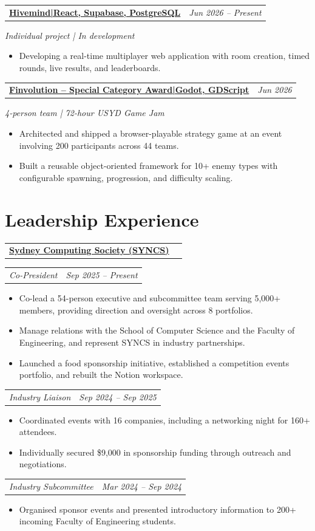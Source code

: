 \documentclass[10pt,a4paper]{article}
\makeatletter
\newcommand{\linkedproject}[4]{%
  \vspace{6pt}
  \begin{tabularx}{\textwidth}{@{}Xr@{}}
    \textbf{\href{#1}{#2\enspace|\enspace#3}} & \textit{#4}
  \end{tabularx}\vspace{-1pt}
}
\newcommand{\projectcontext}[1]{%
  \textit{#1}\par\vspace{-1pt}
}
\newcommand{\organisation}[2]{%
  \vspace{3pt}
  \begin{tabularx}{\textwidth}{@{}Xr@{}}
    \textbf{#1} & \textbf{#2}
  \end{tabularx}\vspace{-1pt}
}
\newcommand{\role}[2]{%
  \begin{tabularx}{\textwidth}{@{}Xr@{}}
    \textit{#1} & \textit{#2}
  \end{tabularx}\vspace{-1pt}
}
\makeatother
\begin{document}
\linkedproject
  {https://meta-game-arena.vercel.app/}
  {Hivemind}
  {React, Supabase, PostgreSQL}
  {Jun 2026 -- Present}
\projectcontext{Individual project | In development}
\begin{itemize}
  \item Developing a real-time multiplayer web application with room creation, timed rounds, live results, and leaderboards.
\end{itemize}

\linkedproject
  {https://richardlr03.itch.io/finvolution}
  {Finvolution -- Special Category Award}
  {Godot, GDScript}
  {Jun 2026}
\projectcontext{4-person team | 72-hour USYD Game Jam}
\begin{itemize}
  \item Architected and shipped a browser-playable strategy game at an event involving 200 participants across 44 teams.
  \item Built a reusable object-oriented framework for 10+ enemy types with configurable spawning, progression, and difficulty scaling.
\end{itemize}

\section{Leadership Experience}

\organisation{\href{https://syncs.org.au/about}{Sydney Computing Society (SYNCS)}}{}
\role{Co-President}{Sep 2025 -- Present}
\begin{itemize}
  \item Co-lead a 54-person executive and subcommittee team serving 5,000+ members, providing direction and oversight across 8 portfolios.
  \item Manage relations with the School of Computer Science and the Faculty of Engineering, and represent SYNCS in industry partnerships.
  \item Launched a food sponsorship initiative, established a competition events portfolio, and rebuilt the Notion workspace.
\end{itemize}
\role{Industry Liaison}{Sep 2024 -- Sep 2025}
\begin{itemize}
  \item Coordinated events with 16 companies, including a networking night for 160+ attendees.
  \item Individually secured \$9,000 in sponsorship funding through outreach and negotiations.
\end{itemize}
\role{Industry Subcommittee}{Mar 2024 -- Sep 2024}
\begin{itemize}
  \item Organised sponsor events and presented introductory information to 200+ incoming Faculty of Engineering students.
\end{itemize}
\end{document}
